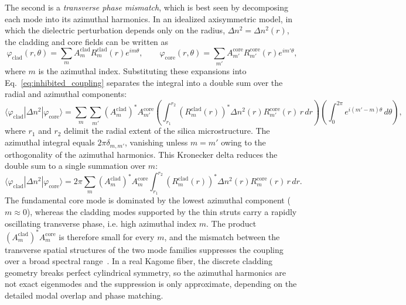 The second is a \emph{transverse phase mismatch}, which is best seen by decomposing each mode into its azimuthal harmonics. In an idealized axisymmetric model, in which the dielectric perturbation depends only on the radius, $\Delta n^2 = \Delta n^2(r)$, the cladding and core fields can be written as
\begin{equation}
\varphi_{\text{clad}}(r,\theta) = \sum_m A_m^{\text{clad}} R_m^{\text{clad}}(r) e^{im\theta}, \qquad
\varphi_{\text{core}}(r,\theta) = \sum_{m'} A_{m'}^{\text{core}} R_{m'}^{\text{core}}(r) e^{im'\theta},
\label{eq:azimuthal_expansions}
\end{equation}
where $m$ is the azimuthal index. Substituting these expansions into Eq.~\ref{eq:inhibited_coupling} separates the integral into a double sum over the radial and azimuthal components:
\begin{equation}
\langle \varphi_{\text{clad}} | \Delta n^2 | \varphi_{\text{core}} \rangle
= \sum_m \sum_{m'} (A_m^{\text{clad}})^* A_{m'}^{\text{core}}
\left( \int_{r_1}^{r_2} (R_m^{\text{clad}}(r))^* \Delta n^2(r) R_{m'}^{\text{core}}(r)\, r\, dr \right)
\left( \int_0^{2\pi} e^{i(m' - m)\theta}\, d\theta \right),
\label{eq:overlap_double_sum}
\end{equation}
where $r_1$ and $r_2$ delimit the radial extent of the silica microstructure. The azimuthal integral equals $2\pi\delta_{m,m'}$, vanishing unless $m = m'$ owing to the orthogonality of the azimuthal harmonics. This Kronecker delta reduces the double sum to a single summation over $m$:
\begin{equation}
\langle \varphi_{\text{clad}} | \Delta n^2 | \varphi_{\text{core}} \rangle
= 2\pi \sum_m (A_m^{\text{clad}})^* A_m^{\text{core}} \int_{r_1}^{r_2} (R_m^{\text{clad}}(r))^* \Delta n^2(r) R_m^{\text{core}}(r)\, r\, dr.
\label{eq:overlap_collapsed}
\end{equation}
The fundamental core mode is dominated by the lowest azimuthal component ($m \approx 0$), whereas the cladding modes supported by the thin struts carry a rapidly oscillating transverse phase, i.e. high azimuthal index $m$. The product $(A_m^{\text{clad}})^* A_m^{\text{core}}$ is therefore small for every $m$, and the mismatch between the transverse spatial structures of the two mode families suppresses the coupling over a broad spectral range~\cite{Debord2019}. In a real Kagome fiber, the discrete cladding geometry breaks perfect cylindrical symmetry, so the azimuthal harmonics are not exact eigenmodes and the suppression is only approximate, depending on the detailed modal overlap and phase matching.

